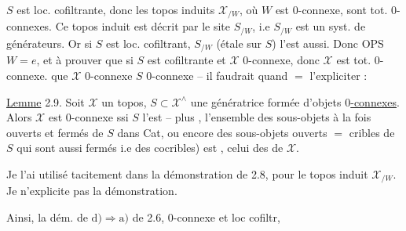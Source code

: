 
$S$ est  loc. cofiltrante, donc  les topos induits $\mathscr X_{/W}$, où $W$ est $0$-connexe, sont tot. $0$-connexes. Ce topos induit est décrit par le site $S_{/W}$, i.e $S_{/W}$ est un syst. de générateurs. Or si $S$ est loc. cofiltrant, $S_{/W}$ (étale sur $S$) l'est aussi. Donc  OPS $W=e$, et à prouver que si $S$ est  cofiltrante et $\mathscr X$ $0$-connexe, donc $\mathscr X$ est tot. $0$-connexe.     que $\mathscr X$ $0$-connexe  $S$ $0$-connexe -- il faudrait quand $=$ l'expliciter :

\uline{Lemme} 2.9.  Soit $\mathscr X$ un topos, $S\subset\mathscr X^\wedge$ une   génératrice formée d'objets \uline{$0$-connexes}. \reversemarginpar\margin{\rule{0.4pt}{13ex}}\normalmarginpar Alors $\mathscr X$ est $0$-connexe ssi $S$ l'est -- plus  , l'ensemble  des sous-objets à la fois ouverts et fermés de $S$ dans Cat,  ou encore des   sous-objets ouverts $=$ cribles de $S$ qui sont aussi fermés i.e des cocribles) est  , celui des     de $\mathscr X$.

Je l'ai utilisé tacitement dans la démonstration de 2.8, pour le topos induit $\mathscr X_{/W}$. Je n'explicite pas la démonstration.

Ainsi,  la dém. de $\mathrm{d)}\Rightarrow\mathrm{a)}$ de 2.6,   $0$-connexe et loc cofiltr,

